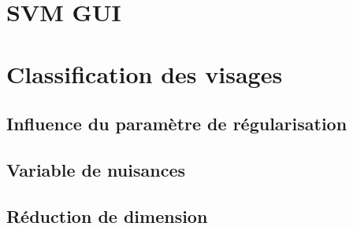 \documentclass[a4paper,12pt]{article}
\begin{document}
\section{SVM GUI}

\section{Classification des visages}

\subsection{Influence du paramètre de régularisation}

\subsection{Variable de nuisances}

\subsection{Réduction de dimension}
\end{document}
